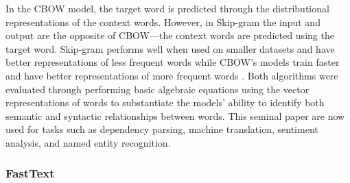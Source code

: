 In the CBOW model, the target word is predicted through the distributional representations of the context words. However, in Skip-gram the input and output are the opposite of CBOW—the context words are predicted using the target word.  Skip-gram performs well when used on smaller datasets and have better representations of less frequent words while CBOW’s models train faster and have better representations of more frequent words \citep{mikolov2013efficient}. Both algorithms were evaluated through performing basic algebraic equations using the vector representations of words to substantiate the models’ ability to identify both semantic and syntactic relationships between words. This seminal paper are now used for tasks such as dependency parsing, machine translation, sentiment analysis, and named entity recognition.

\subsubsection{FastText}